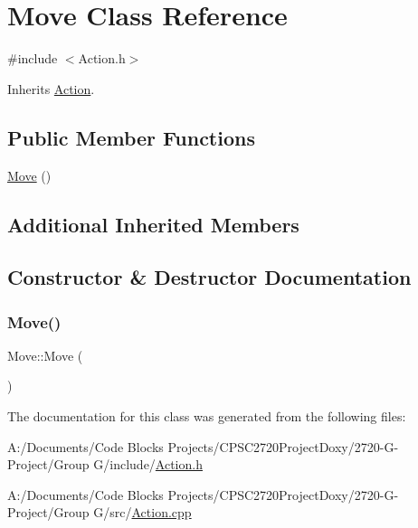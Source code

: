 \hypertarget{class_move}{}\section{Move Class Reference}
\label{class_move}


{\ttfamily \#include $<$Action.\+h$>$}



Inherits \mbox{\hyperlink{class_action}{Action}}.

\subsection*{Public Member Functions}
\begin{DoxyCompactItemize}
\item 
\mbox{\hyperlink{class_move_a4b1acc3a67d30c385ad9a6000526393a}{Move}} ()
\end{DoxyCompactItemize}
\subsection*{Additional Inherited Members}


\subsection{Constructor \& Destructor Documentation}
\mbox{\label{class_move_a4b1acc3a67d30c385ad9a6000526393a}} 
\subsubsection{\texorpdfstring{Move()}{Move()}}
{\footnotesize\ttfamily Move\+::\+Move (\begin{DoxyParamCaption}{ }\end{DoxyParamCaption})}



The documentation for this class was generated from the following files\+:\begin{DoxyCompactItemize}
\item 
A\+:/\+Documents/\+Code Blocks Projects/\+C\+P\+S\+C2720\+Project\+Doxy/2720-\/\+G-\/\+Project/\+Group G/include/\mbox{\hyperlink{_action_8h}{Action.\+h}}\item 
A\+:/\+Documents/\+Code Blocks Projects/\+C\+P\+S\+C2720\+Project\+Doxy/2720-\/\+G-\/\+Project/\+Group G/src/\mbox{\hyperlink{_action_8cpp}{Action.\+cpp}}\end{DoxyCompactItemize}
